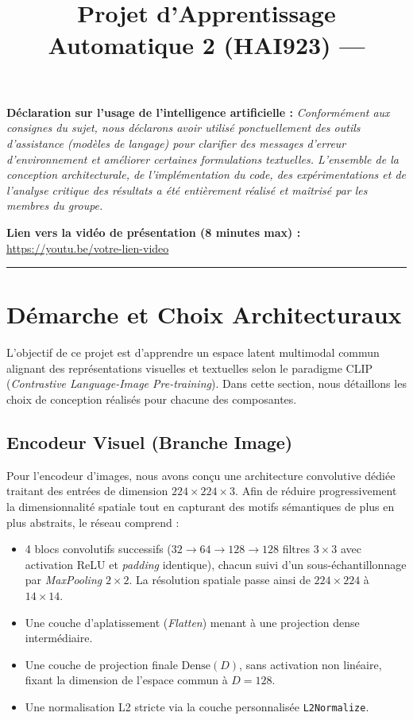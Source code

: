 \documentclass[12pt,a4paper]{article}
\title{\textbf{\ReportTitle}\\[0.2cm]\large Projet d'Apprentissage Automatique 2 (HAI923) — \GroupNumber}
\author{\StudentA \and \StudentB \and \StudentC}
\date{\Year}
\newcommand{\VideoLink}{https://youtu.be/votre-lien-video} %
\begin{document}
\maketitle

\noindent\textbf{Déclaration sur l'usage de l'intelligence artificielle :} \textit{Conformément aux consignes du sujet, nous déclarons avoir utilisé ponctuellement des outils d'assistance (modèles de langage) pour clarifier des messages d'erreur d'environnement et améliorer certaines formulations textuelles. L'ensemble de la conception architecturale, de l'implémentation du code, des expérimentations et de l'analyse critique des résultats a été entièrement réalisé et maîtrisé par les membres du groupe.}

\noindent\textbf{Lien vers la vidéo de présentation (8 minutes max) :}\\
\href{\VideoLink}{\url{\VideoLink}}

\vspace{0.5cm}
\hrule
\vspace{0.5cm}

\section{Démarche et Choix Architecturaux}

L'objectif de ce projet est d'apprendre un espace latent multimodal commun alignant des représentations visuelles et textuelles selon le paradigme CLIP (\textit{Contrastive Language-Image Pre-training}). Dans cette section, nous détaillons les choix de conception réalisés pour chacune des composantes.

\subsection{Encodeur Visuel (Branche Image)}
Pour l'encodeur d'images, nous avons conçu une architecture convolutive dédiée traitant des entrées de dimension $224 \times 224 \times 3$. Afin de réduire progressivement la dimensionnalité spatiale tout en capturant des motifs sémantiques de plus en plus abstraits, le réseau comprend :
\begin{itemize}
    \item 4 blocs convolutifs successifs ($32 \rightarrow 64 \rightarrow 128 \rightarrow 128$ filtres $3 \times 3$ avec activation ReLU et \textit{padding} identique), chacun suivi d'un sous-échantillonnage par \textit{MaxPooling} $2 \times 2$. La résolution spatiale passe ainsi de $224 \times 224$ à $14 \times 14$.
    \item Une couche d'aplatissement (\textit{Flatten}) menant à une projection dense intermédiaire.
    \item Une couche de projection finale $\text{Dense}(D)$, sans activation non linéaire, fixant la dimension de l'espace commun à $D = 128$.
    \item Une normalisation L2 stricte via la couche personnalisée \texttt{L2Normalize}.
\end{itemize}
\end{document}
